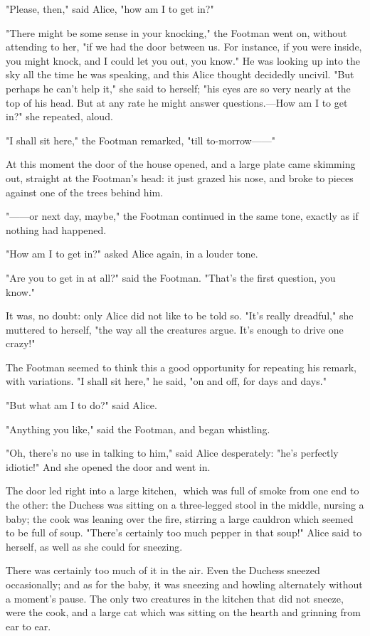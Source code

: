"Please, then," said Alice, "how am I to get in?"

"There might be some sense in your knocking," the Footman went on, without attending to her, "if we had the door between us. For instance, if you were inside, you might knock, and I could let you out, you know." He was looking up into the sky all the time he was speaking, and this Alice thought decidedly uncivil. "But perhaps he can't help it," she said to herself; "his eyes are so very nearly at the top of his head. But at any rate he might answer questions.—How am I to get in?" she repeated, aloud.

"I shall sit here," the Footman remarked, "till to-morrow——"

At this moment the door of the house opened, and a large plate came skimming out, straight at the Footman's head: it just grazed his nose, and broke to pieces against one of the trees behind him.

​"——or next day, maybe," the Footman continued in the same tone, exactly as if nothing had happened.

"How am I to get in?" asked Alice again, in a louder tone.

"Are you to get in at all?" said the Footman. "That's the first question, you know."

It was, no doubt: only Alice did not like to be told so. "It's really dreadful," she muttered to herself, "the way all the creatures argue. It's enough to drive one crazy!"

The Footman seemed to think this a good opportunity for repeating his remark, with variations. "I shall sit here," he said, "on and off, for days and days."

"But what am I to do?" said Alice.

"Anything you like," said the Footman, and began whistling.

"Oh, there's no use in talking to him," said Alice desperately: "he's perfectly idiotic!" And she opened the door and went in.

The door led right into a large kitchen, ​
which was full of smoke from one end to the other: the Duchess was sitting on a three-legged stool in the middle, nursing a baby; the cook was leaning over the fire, stirring a large cauldron which seemed to be full of soup.
"There's certainly too much pepper in that soup!" Alice said to herself, as well as she could for sneezing.

​There was certainly too much of it in the air. Even the Duchess sneezed occasionally; and as for the baby, it was sneezing and howling alternately without a moment's pause. The only two creatures in the kitchen that did not sneeze, were the cook, and a large cat which was sitting on the hearth and grinning from ear to ear.

